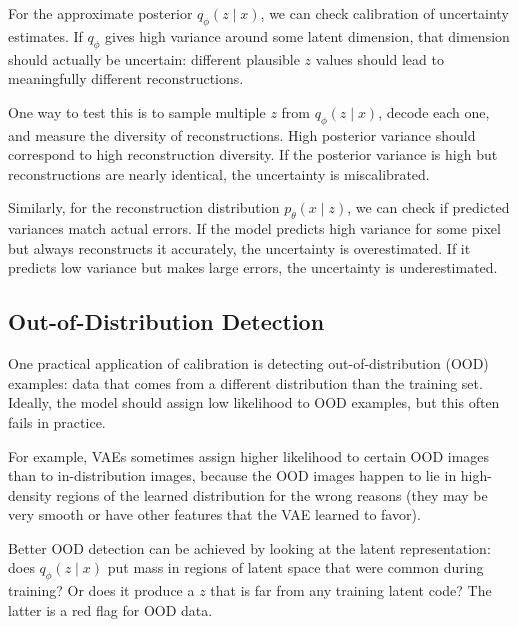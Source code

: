 For the approximate posterior $q_\phi(z \mid x)$, we can check calibration of uncertainty estimates. If $q_\phi$ gives high variance around some latent dimension, that dimension should actually be uncertain: different plausible $z$ values should lead to meaningfully different reconstructions.

\vspace{0.3cm}

One way to test this is to sample multiple $z$ from $q_\phi(z \mid x)$, decode each one, and measure the diversity of reconstructions. High posterior variance should correspond to high reconstruction diversity. If the posterior variance is high but reconstructions are nearly identical, the uncertainty is miscalibrated.

\vspace{0.3cm}

Similarly, for the reconstruction distribution $p_\theta(x \mid z)$, we can check if predicted variances match actual errors. If the model predicts high variance for some pixel but always reconstructs it accurately, the uncertainty is overestimated. If it predicts low variance but makes large errors, the uncertainty is underestimated.

\vspace{1.5em}

\subsection{Out-of-Distribution Detection}

One practical application of calibration is detecting out-of-distribution (OOD) examples: data that comes from a different distribution than the training set. Ideally, the model should assign low likelihood to OOD examples, but this often fails in practice.

\vspace{0.3cm}

For example, VAEs sometimes assign higher likelihood to certain OOD images than to in-distribution images, because the OOD images happen to lie in high-density regions of the learned distribution for the wrong reasons (they may be very smooth or have other features that the VAE learned to favor).

\vspace{0.3cm}

Better OOD detection can be achieved by looking at the latent representation: does $q_\phi(z \mid x)$ put mass in regions of latent space that were common during training? Or does it produce a $z$ that is far from any training latent code? The latter is a red flag for OOD data.

